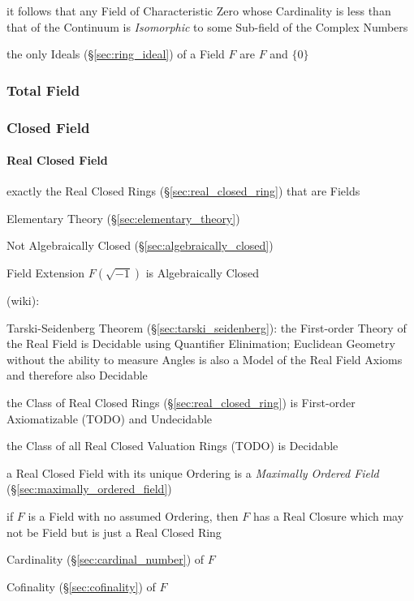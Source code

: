 it follows that any Field of Characteristic Zero whose Cardinality is less than
that of the Continuum is \emph{Isomorphic} to some Sub-field of the Complex
Numbers

the only Ideals (\S\ref{sec:ring_ideal}) of a Field $F$ are $F$ and $\{0\}$



\subsubsection{Total Field}\label{sec:total_field}

\subsubsection{Closed Field}\label{sec:closed_field}

\paragraph{Real Closed Field}\label{sec:real_closed}\hfill

exactly the Real Closed Rings (\S\ref{sec:real_closed_ring}) that are Fields

Elementary Theory (\S\ref{sec:elementary_theory})

Not Algebraically Closed (\S\ref{sec:algebraically_closed})

Field Extension $F(\sqrt{-1})$ is Algebraically Closed

(wiki):

Tarski-Seidenberg Theorem (\S\ref{sec:tarski_seidenberg}): the First-order
Theory of the Real Field is Decidable using Quantifier Elinimation; Euclidean
Geometry without the ability to measure Angles is also a Model of the Real
Field Axioms and therefore also Decidable

the Class of Real Closed Rings (\S\ref{sec:real_closed_ring}) is First-order
Axiomatizable (TODO) and Undecidable

the Class of all Real Closed Valuation Rings (TODO) is Decidable

a Real Closed Field with its unique Ordering is a \emph{Maximally Ordered
  Field} (\S\ref{sec:maximally_ordered_field})

if $F$ is a Field with no assumed Ordering, then $F$ has a Real Closure which
may not be Field but is just a Real Closed Ring

Cardinality (\S\ref{sec:cardinal_number}) of $F$

Cofinality (\S\ref{sec:cofinality}) of $F$

